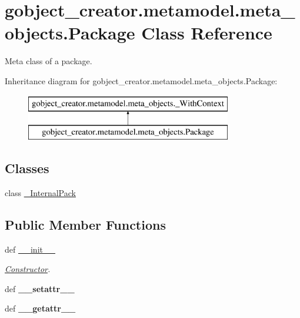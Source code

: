 \hypertarget{classgobject__creator_1_1metamodel_1_1meta__objects_1_1Package}{
\section{gobject\_\-creator.metamodel.meta\_\-objects.Package Class Reference}
\label{classgobject__creator_1_1metamodel_1_1meta__objects_1_1Package}
}


Meta class of a package.  


Inheritance diagram for gobject\_\-creator.metamodel.meta\_\-objects.Package:\begin{figure}[H]
\begin{center}
\leavevmode
\includegraphics[height=2cm]{classgobject__creator_1_1metamodel_1_1meta__objects_1_1Package}
\end{center}
\end{figure}
\subsection*{Classes}
\begin{DoxyCompactItemize}
\item 
class \hyperlink{classgobject__creator_1_1metamodel_1_1meta__objects_1_1Package_1_1__InternalPack}{\_\-InternalPack}
\end{DoxyCompactItemize}
\subsection*{Public Member Functions}
\begin{DoxyCompactItemize}
\item 
def \hyperlink{classgobject__creator_1_1metamodel_1_1meta__objects_1_1Package_af5a888420d4558a79a74036109ac352f}{\_\-\_\-init\_\-\_\-}
\begin{DoxyCompactList}\small\item\em \hyperlink{classgobject__creator_1_1metamodel_1_1meta__objects_1_1Constructor}{Constructor}. \item\end{DoxyCompactList}\item 
\hypertarget{classgobject__creator_1_1metamodel_1_1meta__objects_1_1Package_a1c7df922e06b92ccd3be12d6aa1e77f1}{
def {\bfseries \_\-\_\-setattr\_\-\_\-}}
\label{classgobject__creator_1_1metamodel_1_1meta__objects_1_1Package_a1c7df922e06b92ccd3be12d6aa1e77f1}

\item 
\hypertarget{classgobject__creator_1_1metamodel_1_1meta__objects_1_1Package_aad217125b8ef7504ca0a4e92e0dce3aa}{
def {\bfseries \_\-\_\-getattr\_\-\_\-}}
\label{classgobject__creator_1_1metamodel_1_1meta__objects_1_1Package_aad217125b8ef7504ca0a4e92e0dce3aa}

\end{DoxyCompactItemize}


